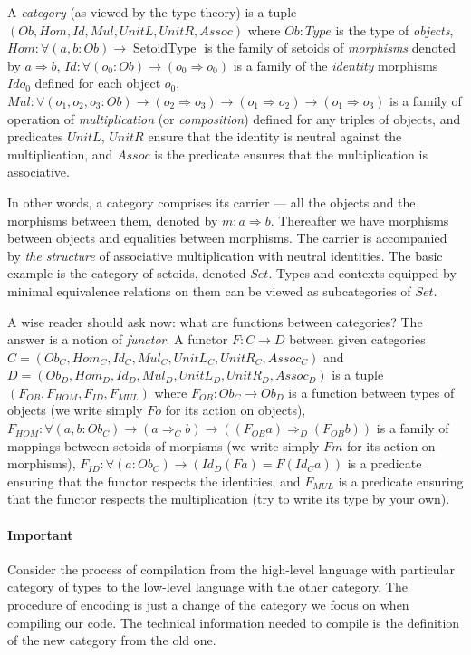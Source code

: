 \documentclass[11pt,oneside]{article}
\begin{document}
A {\em category} (as viewed by the type theory)
is a tuple $(Ob, Hom, Id, Mul, UnitL, UnitR, Assoc)$ where
$Ob : Type$ is the type of {\em objects},
$Hom : \forall(a, b : Ob)\rightarrow \operatorname{SetoidType}$
is the family of
setoids of {\em morphisms} denoted by $a \Rightarrow b$,
$Id : \forall(o_0 : Ob)\rightarrow (o_0 \Rightarrow o_0)$ is a family
of the {\em identity} morphisms $Id o_0$ defined for each object $o_0$,
$Mul : \forall(o_1, o_2, o_3 : Ob) \rightarrow (o_2 \Rightarrow o_3) \rightarrow (o_1 \Rightarrow o_2) \rightarrow (o_1 \Rightarrow o_3)$
is a family of operation of {\em multiplication} (or {\em composition})
defined for any triples of objects, and predicates $UnitL$, $UnitR$
ensure that the identity is neutral against the multiplication, and
$Assoc$ is the predicate ensures that the multiplication is associative.

In other words, a category comprises its carrier ---
all the objects and the morphisms between them,
denoted by $m : a \Rightarrow b$.
Thereafter we have morphisms between objects and equalities between morphisms.
The carrier is accompanied by {\em the structure}
of associative multiplication with neutral identities.
The basic example is the category of setoids, denoted $Set$.
Types and contexts equipped by minimal equivalence relations on them
can be viewed as subcategories of $Set$.

A wise reader should ask now: what are functions between categories?
The answer is a notion of {\em functor}.
A functor $F : C \rightarrow D$ between given categories
$C = (Ob_C, Hom_C, Id_C, Mul_C, UnitL_C, UnitR_C, Assoc_C)$ and
$D = (Ob_D, Hom_D, Id_D, Mul_D, UnitL_D, UnitR_D, Assoc_D)$
is a tuple $(F_{OB}, F_{HOM}, F_{ID}, F_{MUL})$ where
$F_{OB} : Ob_C \rightarrow Ob_D$ is a function between types of objects
(we write simply $F o$ for its action on objects),
$F_{HOM} : \forall(a, b : Ob_C)\rightarrow (a \Rightarrow_C  b) \rightarrow ((F_{OB} a) \Rightarrow_D (F_{OB} b))$
is a family of mappings between setoids of morpisms
(we write simply $F m$ for its action on morphisms),
$F_{ID} : \forall(a : Ob_C)\rightarrow (Id_D (F a) = F (Id_C a))$
is a predicate ensuring that the functor respects the identities,
and $F_{MUL}$ is a predicate ensuring that the functor respects
the multiplication (try to write its type by your own).

\paragraph{Important}
Consider the process of compilation from the high-level language with
particular category of types to the low-level language
with the other category.
The procedure of encoding is just a change of the category
we focus on when compiling our code.
The technical information needed to compile is
the definition of the new category from the old one.
\end{document}
